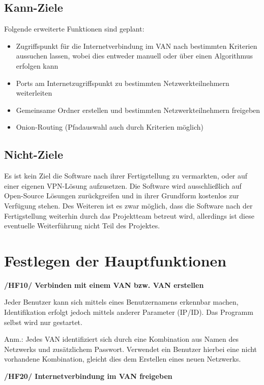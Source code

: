\documentclass[a4paper,12pt]{scrreprt}
\begin{document}
			
		\subsection{Kann-Ziele}
			Folgende erweiterte Funktionen sind geplant:
			\begin{itemize}
			\item Zugriffspunkt für die Internetverbindung im VAN nach bestimmten Kriterien aussuchen lassen, wobei dies entweder manuell oder über einen Algorithmus erfolgen kann
			
			\item Ports am Internetzugriffspunkt zu bestimmten Netzwerkteilnehmern weiterleiten
			\item Gemeinsame Ordner erstellen und bestimmten Netzwerkteilnehmern freigeben
			
			\item Onion-Routing (Pfadauswahl auch durch Kriterien möglich)
			
			\end{itemize}
			
		\subsection{Nicht-Ziele}
			Es ist kein Ziel die Software nach ihrer Fertigstellung zu vermarkten, oder auf einer eigenen VPN-Lösung aufzusetzen. Die Software wird ausschließlich auf Open-Source Lösungen zurückgreifen und in ihrer Grundform kostenlos zur Verfügung stehen. Des Weiteren ist es zwar möglich, dass die Software nach der Fertigstellung weiterhin durch das Projektteam betreut wird, allerdings ist diese eventuelle Weiterführung nicht Teil des Projektes.
			
	\section{Festlegen der Hauptfunktionen}
		\textbf{/HF10/ Verbinden mit einem VAN bzw. VAN erstellen}
		
		Jeder Benutzer kann sich mittels eines Benutzernamens erkennbar machen, Identifikation erfolgt jedoch mittels anderer Parameter (IP/ID). Das Programm selbst wird nur gestartet.
		
		Anm.: Jedes VAN identifiziert sich durch eine Kombination aus Namen des Netzwerks und zusätzlichem Passwort. Verwendet ein Benutzer hierbei eine nicht vorhandene Kombination, gleicht dies dem Erstellen eines neuen Netzwerks. 
		
		\textbf { /HF20/ Internetverbindung im VAN freigeben} 
		
\end{document}
